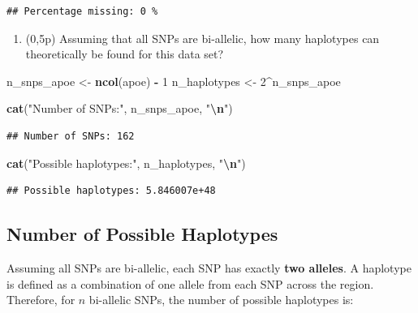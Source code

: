 \documentclass[
]{article}
\newenvironment{Shaded}{\begin{snugshade}}{\end{snugshade}}
\newcommand{\DecValTok}[1]{\textcolor[rgb]{0.00,0.00,0.81}{#1}}
\newcommand{\FunctionTok}[1]{\textcolor[rgb]{0.13,0.29,0.53}{\textbf{#1}}}
\newcommand{\NormalTok}[1]{#1}
\newcommand{\OtherTok}[1]{\textcolor[rgb]{0.56,0.35,0.01}{#1}}
\newcommand{\SpecialCharTok}[1]{\textcolor[rgb]{0.81,0.36,0.00}{\textbf{#1}}}
\newcommand{\StringTok}[1]{\textcolor[rgb]{0.31,0.60,0.02}{#1}}
\providecommand{\tightlist}{%
  \setlength{\itemsep}{0pt}\setlength{\parskip}{0pt}}
\begin{document}
\begin{verbatim}
## Percentage missing: 0 %
\end{verbatim}

\begin{enumerate}
\def\labelenumi{\arabic{enumi}.}
\setcounter{enumi}{1}
\tightlist
\item
  (0,5p) Assuming that all SNPs are bi-allelic, how many haplotypes can
  theoretically be found for this data set?
\end{enumerate}

\begin{Shaded}
\begin{Highlighting}[]
\NormalTok{n\_snps\_apoe }\OtherTok{\textless{}{-}} \FunctionTok{ncol}\NormalTok{(apoe) }\SpecialCharTok{{-}} \DecValTok{1}
\NormalTok{n\_haplotypes }\OtherTok{\textless{}{-}} \DecValTok{2}\SpecialCharTok{\^{}}\NormalTok{n\_snps\_apoe}

\FunctionTok{cat}\NormalTok{(}\StringTok{"Number of SNPs:"}\NormalTok{, n\_snps\_apoe, }\StringTok{"}\SpecialCharTok{\textbackslash{}n}\StringTok{"}\NormalTok{)}
\end{Highlighting}
\end{Shaded}

\begin{verbatim}
## Number of SNPs: 162
\end{verbatim}

\begin{Shaded}
\begin{Highlighting}[]
\FunctionTok{cat}\NormalTok{(}\StringTok{"Possible haplotypes:"}\NormalTok{, n\_haplotypes, }\StringTok{"}\SpecialCharTok{\textbackslash{}n}\StringTok{"}\NormalTok{)}
\end{Highlighting}
\end{Shaded}

\begin{verbatim}
## Possible haplotypes: 5.846007e+48
\end{verbatim}

\subsection{Number of Possible
Haplotypes}\label{number-of-possible-haplotypes}

Assuming all SNPs are bi-allelic, each SNP has exactly \textbf{two
alleles}. A haplotype is defined as a combination of one allele from
each SNP across the region. Therefore, for \(n\) bi-allelic SNPs, the
number of possible haplotypes is:
\end{document}
